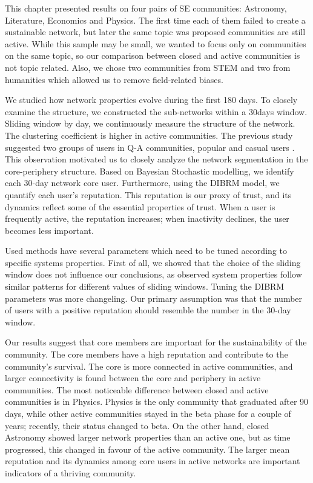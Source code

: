 This chapter presented results on four pairs of SE communities: Astronomy, Literature, Economics and Physics. The first time each of them failed to create a sustainable network, but later the same topic was proposed communities are still active. While this sample may be small, we wanted to focus only on communities on the same topic, so our comparison between closed and active communities is not topic related. Also, we chose two communities from STEM and two from humanities which allowed us to remove field-related biases. 

We studied how network properties evolve during the first 180 days. To closely examine the structure, we constructed the sub-networks within a 30days window. Sliding window by day, we continuously measure the structure of the network. The clustering coefficient is higher in active communities. The previous study suggested two groups of users in Q-A communities, popular and casual users \cite{santos2019self}. This observation motivated us to closely analyze the network segmentation in the core-periphery structure. Based on Bayesian Stochastic modelling, we identify each 30-day network core user.
Furthermore, using the DIBRM model\cite{melnikov2018toward}, we quantify each user's reputation. This reputation is our proxy of trust, and its dynamics reflect some of the essential properties of trust. When a user is frequently active, the reputation increases; when inactivity declines, the user becomes less important.   

Used methods have several parameters which need to be tuned according to specific systems properties. First of all, we showed that the choice of the sliding window does not influence our conclusions, as observed system properties follow similar patterns for different values of sliding windows. Tuning the DIBRM parameters was more changeling. Our primary assumption was that the number of users with a positive reputation should resemble the number in the 30-day window.

Our results suggest that core members are important for the sustainability of the community. The core members have a high reputation and contribute to the community’s survival. The core is more connected in active communities, and larger connectivity is found between the core and periphery in active communities. The most noticeable difference between closed and active communities is in Physics. Physics is the only community that graduated after 90 days, while other active communities stayed in the beta phase for a couple of years; recently, their status changed to beta. On the other hand, closed Astronomy showed larger network properties than an active one, but as time progressed, this changed in favour of the active community. The larger mean reputation and its dynamics among core users in active networks are important indicators of a thriving community.

